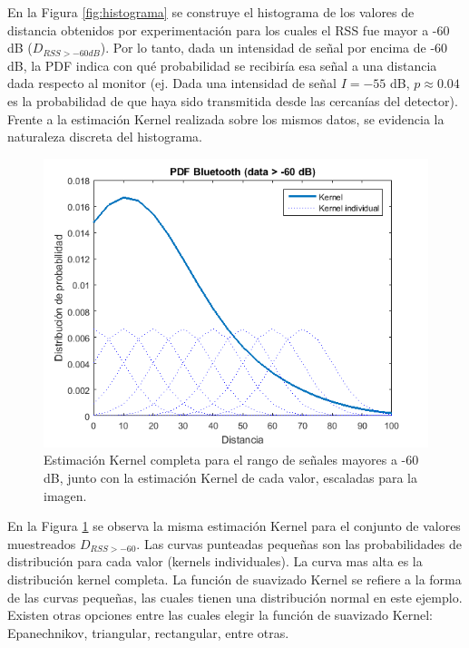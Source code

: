 En la Figura \ref{fig:histograma} se construye el histograma de los valores de distancia obtenidos por experimentación para los cuales el RSS fue mayor a -60 dB ($D_{RSS>-60dB}$). Por lo tanto, dada un intensidad de señal por encima de -60 dB, la PDF indica con qué probabilidad se recibiría esa señal a una distancia dada respecto al monitor (ej. Dada una intensidad de señal $I=-55$ dB,  $p\approx0.04$ es la probabilidad de que haya sido transmitida desde las cercanías del detector). Frente a la estimación Kernel realizada sobre los mismos datos, se evidencia la naturaleza discreta del histograma. 

\begin{figure}[!htp]
	\centering
	\includegraphics[scale=0.5]{images/kernel-individual.png}
	\captionsetup{width=0.7\textwidth}
	\caption{Estimación Kernel completa para el rango de señales mayores a -60 dB, junto con la estimación Kernel de cada valor, escaladas para la imagen.}
    \label{fig:kernel-individual}
\end{figure}

En la Figura \ref{fig:kernel-individual} se observa la misma estimación Kernel para el conjunto de valores muestreados $D_{RSS>-60}$. Las curvas punteadas pequeñas son las probabilidades de distribución para cada valor (kernels individuales). La curva mas alta es la distribución kernel completa. La función de suavizado Kernel se refiere a la forma de las curvas pequeñas, las cuales tienen una distribución normal en este ejemplo.
Existen otras opciones entre las cuales elegir la función de suavizado Kernel: Epanechnikov, triangular, rectangular, entre otras. 

